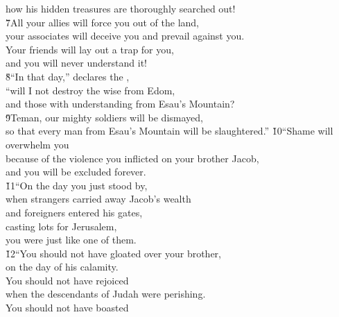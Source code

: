 \begin{poetry}
\poemll    how his hidden treasures are thoroughly searched out! \\
\poeml \v{7}All your allies will force you out of the land, \\
\poemll    your associates will deceive you and prevail against you. \\
\poeml Your friends will lay out a trap for you, \\
\poemll    and you will never understand it! \\
\poeml \v{8}``In that day,'' declares the , \\
\poemll    ``will I not destroy the wise from Edom, \\
\poemll    and those with understanding from Esau's Mountain? \\
\poeml \v{9}Teman, our mighty soldiers will be dismayed, \\
\poemll    so that every man from Esau's Mountain will be slaughtered.''
\poeml \v{10}``Shame will overwhelm you \\
\poemll    because of the violence you inflicted on your brother Jacob, \\
\poeml and you will be excluded forever. \\
\poeml \v{11}``On the day you just stood by, \\
\poeml when strangers carried away Jacob's wealth \\
\poeml and foreigners entered his gates, \\
\poemll    casting lots for Jerusalem, \\
\poeml you were just like one of them. \\
\poeml \v{12}``You should not have gloated over your brother, \\
\poemll    on the day of his calamity. \\
\poeml You should not have rejoiced \\
\poemll    when the descendants of Judah were perishing. \\
\poeml You should not have boasted \\

\end{poetry}
